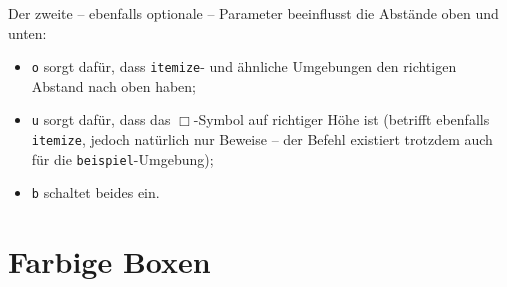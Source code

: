 			\vspace*{.5em}
			Der zweite -- ebenfalls optionale -- Parameter beeinflusst die Abstände oben und unten:
			\begin{itemize}
				\item \texttt o sorgt dafür, dass \texttt{itemize}- und ähnliche Umgebungen den richtigen Abstand nach oben haben;
				\item \texttt u sorgt dafür, dass das $\Box$-Symbol auf richtiger Höhe ist (betrifft ebenfalls \texttt{itemize}, jedoch natürlich nur Beweise -- der Befehl existiert trotzdem auch für die \texttt{beispiel}-Umgebung);
				\item \texttt b schaltet beides ein.
			\end{itemize}
			
			
	\chapter{Farbige Boxen}
